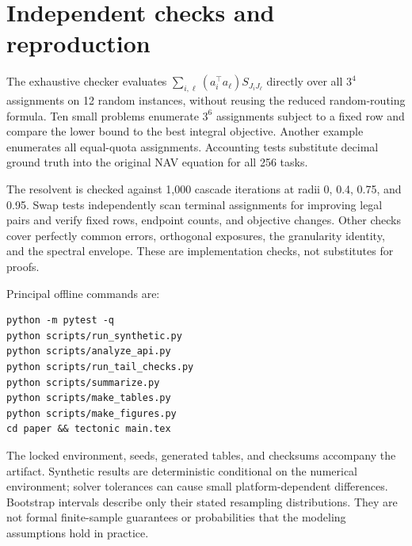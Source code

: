 \documentclass[11pt]{article}
\begin{document}
\section{Independent checks and reproduction}
The exhaustive checker evaluates
\(\sum_{i,\ell}(a_i^\top a_\ell)S_{J_iJ_\ell}\) directly over all \(3^4\) assignments on 12 random instances, without reusing the reduced random-routing formula. Ten small problems enumerate \(3^6\) assignments subject to a fixed row and compare the lower bound to the best integral objective. Another example enumerates all equal-quota assignments. Accounting tests substitute decimal ground truth into the original NAV equation for all 256 tasks.

The resolvent is checked against 1,000 cascade iterations at radii 0, 0.4, 0.75, and 0.95. Swap tests independently scan terminal assignments for improving legal pairs and verify fixed rows, endpoint counts, and objective changes. Other checks cover perfectly common errors, orthogonal exposures, the granularity identity, and the spectral envelope. These are implementation checks, not substitutes for proofs.

Principal offline commands are:
\begin{lstlisting}[basicstyle=\ttfamily\small,breaklines=true,frame=single]
python -m pytest -q
python scripts/run_synthetic.py
python scripts/analyze_api.py
python scripts/run_tail_checks.py
python scripts/summarize.py
python scripts/make_tables.py
python scripts/make_figures.py
cd paper && tectonic main.tex
\end{lstlisting}
The locked environment, seeds, generated tables, and checksums accompany the artifact. Synthetic results are deterministic conditional on the numerical environment; solver tolerances can cause small platform-dependent differences. Bootstrap intervals describe only their stated resampling distributions. They are not formal finite-sample guarantees or probabilities that the modeling assumptions hold in practice.
\end{document}
